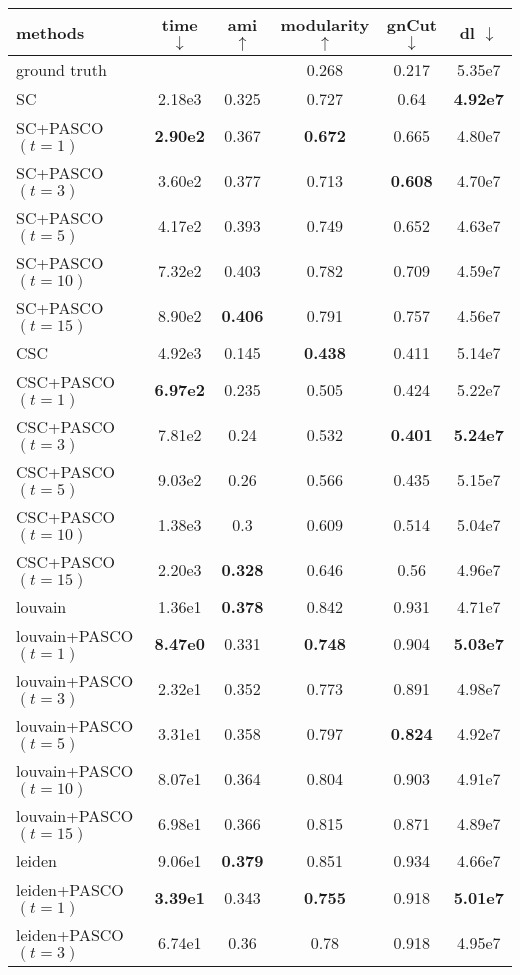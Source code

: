 \begin{tabular}{lccccc}
\toprule
methods & time $\downarrow$ & ami $\uparrow$ & modularity $\uparrow$ & gnCut $\downarrow$ & dl $\downarrow$ \\
\midrule
ground truth &  &  & 0.268 & 0.217 & 5.35e7 \\
\midrule
SC & 2.18e3 & 0.325 & 0.727 & 0.64 & \textbf{4.92e7} \\
SC+PASCO $(t=1)$ & \textbf{2.90e2} & 0.367 & \textbf{0.672} & 0.665 & 4.80e7 \\
SC+PASCO $(t=3)$ & 3.60e2 & 0.377 & 0.713 & \textbf{0.608} & 4.70e7 \\
SC+PASCO $(t=5)$ & 4.17e2 & 0.393 & 0.749 & 0.652 & 4.63e7 \\
SC+PASCO $(t=10)$ & 7.32e2 & 0.403 & 0.782 & 0.709 & 4.59e7 \\
SC+PASCO $(t=15)$ & 8.90e2 & \textbf{0.406} & 0.791 & 0.757 & 4.56e7 \\
\midrule
CSC & 4.92e3 & 0.145 & \textbf{0.438} & 0.411 & 5.14e7 \\
CSC+PASCO $(t=1)$ & \textbf{6.97e2} & 0.235 & 0.505 & 0.424 & 5.22e7 \\
CSC+PASCO $(t=3)$ & 7.81e2 & 0.24 & 0.532 & \textbf{0.401} & \textbf{5.24e7} \\
CSC+PASCO $(t=5)$ & 9.03e2 & 0.26 & 0.566 & 0.435 & 5.15e7 \\
CSC+PASCO $(t=10)$ & 1.38e3 &  0.3 & 0.609 & 0.514 & 5.04e7 \\
CSC+PASCO $(t=15)$ & 2.20e3 & \textbf{0.328} & 0.646 & 0.56 & 4.96e7 \\
\midrule
louvain & 1.36e1 & \textbf{0.378} & 0.842 & 0.931 & 4.71e7 \\
louvain+PASCO $(t=1)$ & \textbf{8.47e0} & 0.331 & \textbf{0.748} & 0.904 & \textbf{5.03e7} \\
louvain+PASCO $(t=3)$ & 2.32e1 & 0.352 & 0.773 & 0.891 & 4.98e7 \\
louvain+PASCO $(t=5)$ & 3.31e1 & 0.358 & 0.797 & \textbf{0.824} & 4.92e7 \\
louvain+PASCO $(t=10)$ & 8.07e1 & 0.364 & 0.804 & 0.903 & 4.91e7 \\
louvain+PASCO $(t=15)$ & 6.98e1 & 0.366 & 0.815 & 0.871 & 4.89e7 \\
\midrule
leiden & 9.06e1 & \textbf{0.379} & 0.851 & 0.934 & 4.66e7 \\
leiden+PASCO $(t=1)$ & \textbf{3.39e1} & 0.343 & \textbf{0.755} & 0.918 & \textbf{5.01e7} \\
leiden+PASCO $(t=3)$ & 6.74e1 & 0.36 & 0.78 & 0.918 & 4.95e7 \\

\end{tabular}
